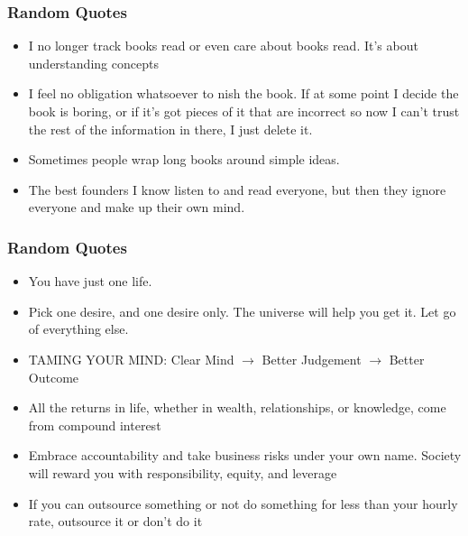 \begin{frame}[fragile]\frametitle{ Random Quotes}

\begin{itemize}
\item I no longer track books read or even care about books read. It’s about
understanding concepts

\item I feel no obligation whatsoever to  nish the book. If at some point I
decide the book is boring, or if it’s got pieces of it that are incorrect so
now I can’t trust the rest of the information in there, I just delete it.

\item Sometimes people wrap long books around simple ideas.

\item The best founders I know listen to and read everyone, but then they
ignore everyone and make up their own mind.
\end{itemize}

\end{frame}

\begin{frame}[fragile]\frametitle{ Random Quotes}

\begin{itemize}
\item You have just one life.
\item Pick one desire, and one desire only. The universe will help
you get it. Let go of everything else.
\item  TAMING YOUR MIND: Clear Mind $\rightarrow$ Better Judgement $\rightarrow$ Better
Outcome
\item All the returns in life, whether in wealth, relationships, or knowledge, come from compound interest
 
\item Embrace accountability and take business risks under your own name. Society will reward you with responsibility, equity, and leverage
 
\item If you can outsource something or not do something for less than your hourly rate, outsource it or don’t do it
\end{itemize}

\end{frame}

